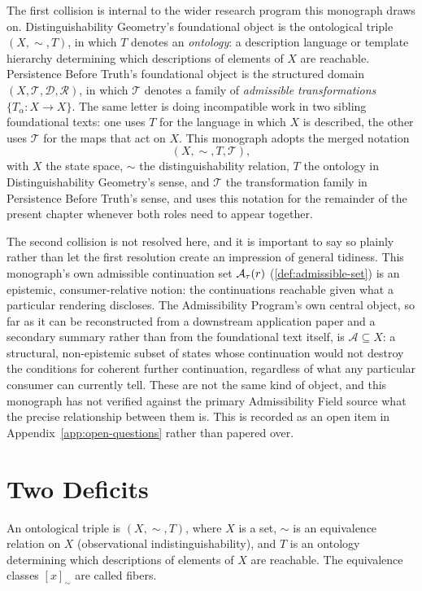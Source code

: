 The first collision is internal to the wider research program this monograph
draws on. Distinguishability Geometry's foundational object is the ontological
triple $(X, \sim, T)$, in which $T$ denotes an \emph{ontology}: a description
language or template hierarchy determining which descriptions of elements of
$X$ are reachable. Persistence Before Truth's foundational object is the
structured domain $(X, \mathcal{T}, \mathcal{D}, \mathcal{R})$, in which
$\mathcal{T}$ denotes a family of \emph{admissible transformations}
$\{T_\alpha : X \to X\}$. The same letter is doing incompatible work in two
sibling foundational texts: one uses $T$ for the language in which $X$ is
described, the other uses $\mathcal{T}$ for the maps that act on $X$. This
monograph adopts the merged notation
\[
(X, \sim, T, \mathcal{T}),
\]
with $X$ the state space, $\sim$ the distinguishability relation, $T$ the
ontology in Distinguishability Geometry's sense, and $\mathcal{T}$ the
transformation family in Persistence Before Truth's sense, and uses this
notation for the remainder of the present chapter whenever both roles need to
appear together.

The second collision is not resolved here, and it is important to say so
plainly rather than let the first resolution create an impression of general
tidiness. This monograph's own admissible continuation set
$\mathcal{A}_{\tau}(r)$ (\cref{def:admissible-set}) is an epistemic, consumer-relative
notion: the continuations reachable given what a particular rendering
discloses. The Admissibility Program's own central object, so far as it can
be reconstructed from a downstream application paper and a secondary summary
rather than from the foundational text itself, is $\mathcal{A} \subseteq X$:
a structural, non-epistemic subset of states whose continuation would not
destroy the conditions for coherent further continuation, regardless of what
any particular consumer can currently tell. These are not the same kind of
object, and this monograph has not verified against the primary Admissibility
Field source what the precise relationship between them is. This is recorded
as an open item in Appendix~\ref{app:open-questions} rather than papered over.

\section{Two Deficits}
\label{sec:two-deficits}


\begin{definition}
\label{def:ontological-triple}
An ontological triple is $(X, \sim, T)$, where $X$ is a set, $\sim$ is an
equivalence relation on $X$ (observational indistinguishability), and $T$ is
an ontology determining which descriptions of elements of $X$ are reachable.
The equivalence classes $[x]_\sim$ are called fibers.
\end{definition}

